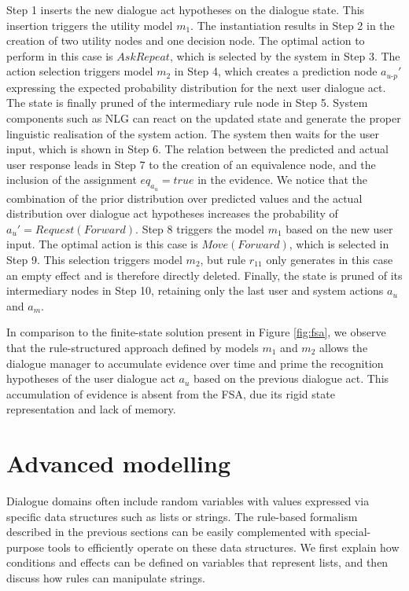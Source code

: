 Step 1 inserts the new dialogue act hypotheses on the dialogue state.  This insertion triggers 
the utility model $m_1$. The instantiation results in Step 2 in the creation of two utility nodes and one decision node.  The optimal action to perform in this case is $\mathit{AskRepeat}$, which is selected by the system in Step 3. The action selection triggers model $m_2$ in Step 4, which creates a prediction node $a_{u\mbox{-}p}'$ expressing the expected probability distribution for the next user dialogue act. The state is finally pruned of the intermediary rule node in Step 5.  System components such as NLG can react on the updated state and generate the proper linguistic realisation of the system action. The system then waits for the user input, which is shown in Step 6.  The relation between the predicted and actual user response leads in Step 7 to the creation of an equivalence node, and the inclusion of the assignment $eq_{a_u} = true$ in the evidence. We notice that the combination of the prior distribution over predicted values and the actual distribution over dialogue act hypotheses increases the probability of $a_u' = \mathit{Request(Forward)}$. Step 8 triggers the model $m_1$ based on the new user input.  The optimal action is this case is $\mathit{Move(Forward)}$, which is selected in Step 9.  This selection triggers model $m_2$, but rule $r_{11}$ only generates in this case an empty effect and is therefore directly deleted. Finally, the state is pruned of its intermediary nodes in Step 10, retaining only the last user and system actions $a_u$ and $a_m$. 

In comparison to the finite-state solution present in Figure \ref{fig:fsa}, we observe that the rule-structured approach defined by models $m_1$ and $m_2$ allows the dialogue manager to 
accumulate evidence over time and prime the recognition hypotheses of the user dialogue act $a_u$ based on the previous dialogue act.  This accumulation of evidence is absent from the FSA, due its rigid state representation and lack of memory. 

\section{Advanced modelling}
\label{sec:amodelling}

Dialogue domains often include random variables with values expressed via specific data structures such as lists or strings. The rule-based formalism described in the previous sections can be easily complemented with special-purpose tools to efficiently operate on these data structures. We first explain how conditions and effects can be defined on variables that represent lists, and then discuss how rules can manipulate strings. 

